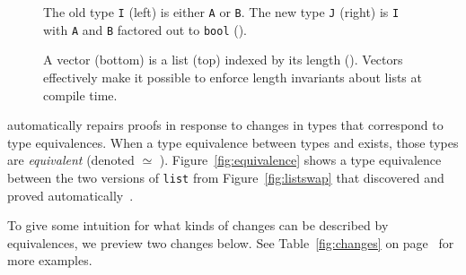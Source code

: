\begin{figure}
\begin{minipage}{0.48\columnwidth}

\end{minipage}
\hfill
\begin{minipage}{0.48\columnwidth}

\end{minipage}
\vspace{-0.4cm}
\caption{The old type \lstinline{I} (left) is either \lstinline{A} or \lstinline{B}. The new type \lstinline{J} (right) is \lstinline{I} with \lstinline{A} and \lstinline{B} factored out to \lstinline{bool} ().}
\label{fig:equivalence2}
\end{figure}

\begin{figure}
\begin{minipage}{0.48\textwidth}
   
\end{minipage}
\hfill
\begin{minipage}{0.58\textwidth}
   
\end{minipage}
\vspace{-0.4cm}
\caption{A vector (bottom) is a list (top) indexed by its length (). Vectors effectively make it possible to enforce length invariants about lists at compile time.}
\label{fig:listtovect}
\end{figure}

\toolnamec automatically repairs proofs in response to changes in types that correspond to type equivalences.
When a type equivalence between types \Aa and \B exists, those types are \textit{equivalent} (denoted \Aa $\simeq$ \B). %
Figure~\ref{fig:equivalence} shows a type equivalence between the two versions of \lstinline{list}
from Figure~\ref{fig:listswap} that \toolnamec discovered and proved automatically~\href{https://github.com/uwplse/pumpkin-pi/blob/v2.0.0/plugin/coq/Swap.v}{}.

To give some intuition for what kinds of changes can be described by equivalences, we preview two changes below.
See Table~\ref{fig:changes} on page~\pageref{fig:changes} for more examples.

